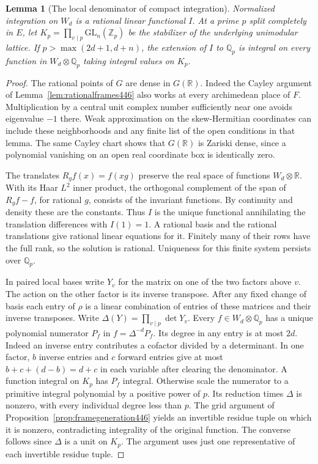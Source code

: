 \documentclass[a4paper,11pt]{article}
\newtheorem{lemma}[proposition]{Lemma}
\theoremstyle{definition}
\theoremstyle{remark}
\numberwithin{equation}{section}
\begin{document}
\begin{lemma}[The local denominator of compact integration]\leavevmode
\label{lem:integralhaar447}
Normalized integration on \(W_d\) is a rational linear functional
\(I\). At a prime \(p\) split completely in \(E\), let
\(K_p=\prod_{v\mid p}\mathrm{GL}_n(\mathbb Z_p)\) be the stabilizer
of the underlying unimodular lattice. If \(p>\max(2d+1,d+n)\),
the extension of \(I\) to \(\mathbb Q_p\) is integral on every
function in \(W_d\otimes\mathbb Q_p\) taking integral values on
\(K_p\).
\end{lemma}
\begin{proof}
The rational points of \(G\) are dense in \(G(\mathbb R)\).
Indeed the Cayley argument of Lemma~\ref{lem:rationalframes446}
also works at every archimedean place of \(F\). Multiplication by a
central unit complex number sufficiently near one avoids eigenvalue
\(-1\) there. Weak approximation on the skew-Hermitian coordinates
can include these neighborhoods and any finite list of the open
conditions in that lemma. The same Cayley chart shows that
\(G(\mathbb R)\) is Zariski dense, since a polynomial vanishing on
an open real coordinate box is identically zero.

The translates \(R_g f(x)=f(xg)\) preserve the real space of
functions \(W_d\otimes\mathbb R\). With its Haar \(L^2\) inner
product, the orthogonal complement of the span of
\(R_g f-f\), for rational \(g\), consists of the invariant
functions. By continuity and density these are the constants.
Thus \(I\) is the unique functional annihilating the translation
differences with \(I(1)=1\). A rational basis and the rational
translations give rational linear equations for it. Finitely many
of their rows have the full rank, so the solution is rational.
Uniqueness for this finite system persists over \(\mathbb Q_p\).

In paired local bases write \(Y_v\) for the matrix on one of the
two factors above \(v\). The action on the other factor is its
inverse transpose. After any fixed change of basis each entry of
\(\rho\) is a linear combination of entries of these matrices and
their inverse transposes. Write \(\Delta(Y)=\prod_{v\mid p}\det Y_v\).
Every \(f\in W_d\otimes\mathbb Q_p\) has a unique polynomial
numerator \(P_f\) in \(f=\Delta^{-d}P_f\). Its degree in any entry
is at most \(2d\). Indeed an inverse entry contributes a cofactor
divided by a determinant. In one factor, \(b\) inverse entries
and \(c\) forward entries give at most \(b+c+(d-b)=d+c\)
in each variable after clearing the denominator. A function
integral on \(K_p\) has \(P_f\) integral. Otherwise scale the
numerator to a primitive integral polynomial by a positive power
of \(p\). Its reduction times \(\Delta\) is nonzero, with every
individual degree less than \(p\). The grid argument of
Proposition~\ref{prop:framegeneration446} yields an invertible
residue tuple on which it is nonzero, contradicting integrality
of the original function. The converse follows since \(\Delta\)
is a unit on \(K_p\). The argument uses just one representative
of each invertible residue tuple.


\end{proof}
\end{document}
